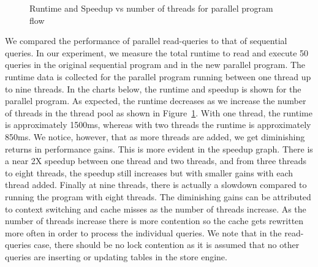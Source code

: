 \documentclass[11pt,journal,compsoc]{IEEEtran}
\begin{document}
\begin{figure}
\captionsetup{justification=centering}
\centerline{
\hfill
{}}
\caption{Runtime and Speedup vs number of threads for parallel program flow}
\label{fig:speedup_reads}
\end{figure} 

We compared the performance of parallel read-queries to that of sequential queries. In our experiment, we measure the total runtime to read and execute 50 queries in the original sequential program and in the new parallel program. The runtime data is collected for the parallel program running between one thread up to nine threads. In the charts below, the runtime and speedup is shown for the parallel program. As expected, the runtime decreases as we increase the number of threads in the thread pool as shown in Figure~\ref{fig:speedup_reads}. With one thread, the runtime is approximately 1500ms, whereas with two threads the runtime is approximately 850ms. We notice, however, that as more threads are added, we get diminishing returns in performance gains. This is more evident in the speedup graph. There is a near 2X speedup between one thread and two threads, and from three threads to eight threads, the speedup still increases but with smaller gains with each thread added. Finally at nine threads, there is actually a slowdown compared to running the program with eight threads. The diminishing gains can be attributed to context switching and cache misses as the number of threads increase. As the number of threads increase there is more contention so the cache gets rewritten more often in order to process the individual queries. We note that in the read-queries case, there should be no lock contention as it is assumed that no other queries are inserting or updating tables in the store engine.
\end{document}
